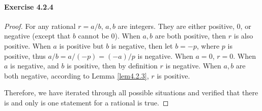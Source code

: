 \paragraph{Exercise 4.2.4} \label{exercise4.2.4}
\begin{proof}
For any rational $r = a/b$, $a,b$ are integers.
They are either positive, $0$, or negative (except that $b$ cannot be 0). When $a,b$ are both positive, 
then $r$ is also positive. When $a$ is positive but $b$ is negative, then let $b=-p$, where $p$ is 
positive, thus $a/b = a/(-p) = (-a)/p$ is negative. When $a=0$, $r=0$. When $a$ is negative, and $b$ is 
positive, then by definition $r$ is negative. When $a,b$ are both negative, according to Lemma 
\ref{lem4.2.3}, $r$ is positive.

Therefore, we have iterated through all possible situations and verified that there is and only is one 
statement for a rational is true.
\end{proof}

